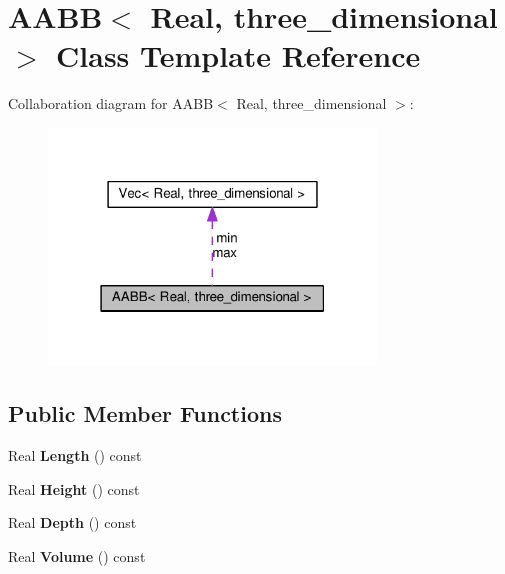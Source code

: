 \hypertarget{classAABB_3_01Real_00_01three__dimensional_01_4}{}\section{A\+A\+B\+B$<$ Real, three\+\_\+dimensional $>$ Class Template Reference}
\label{classAABB_3_01Real_00_01three__dimensional_01_4}


Collaboration diagram for A\+A\+B\+B$<$ Real, three\+\_\+dimensional $>$\+:\nopagebreak
\begin{figure}[H]
\begin{center}
\leavevmode
\includegraphics[width=247pt]{classAABB_3_01Real_00_01three__dimensional_01_4__coll__graph}
\end{center}
\end{figure}
\subsection*{Public Member Functions}
\begin{DoxyCompactItemize}
\item 
\hypertarget{classAABB_3_01Real_00_01three__dimensional_01_4_aba455f7183e007051b93e405fe474621}{}Real {\bfseries Length} () const \label{classAABB_3_01Real_00_01three__dimensional_01_4_aba455f7183e007051b93e405fe474621}

\item 
\hypertarget{classAABB_3_01Real_00_01three__dimensional_01_4_ad3456e9fb2e64df7567b8cdedcd2c614}{}Real {\bfseries Height} () const \label{classAABB_3_01Real_00_01three__dimensional_01_4_ad3456e9fb2e64df7567b8cdedcd2c614}

\item 
\hypertarget{classAABB_3_01Real_00_01three__dimensional_01_4_a719fc794b4792918aefd2e1ee4014dc6}{}Real {\bfseries Depth} () const \label{classAABB_3_01Real_00_01three__dimensional_01_4_a719fc794b4792918aefd2e1ee4014dc6}

\item 
\hypertarget{classAABB_3_01Real_00_01three__dimensional_01_4_adadc6a1e70c803de43969200d5012d49}{}Real {\bfseries Volume} () const \label{classAABB_3_01Real_00_01three__dimensional_01_4_adadc6a1e70c803de43969200d5012d49}

\end{DoxyCompactItemize}
